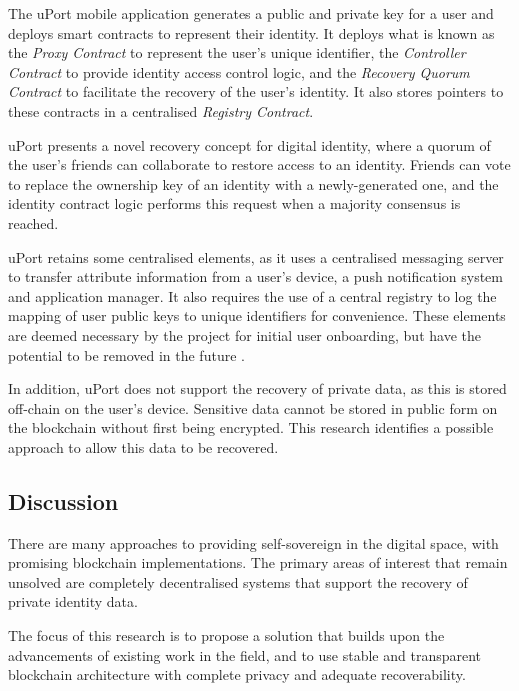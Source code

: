 The uPort mobile application generates a public and private key for a user and deploys smart contracts to represent their identity. It deploys what is known as the \textit{Proxy Contract} to represent the user's unique identifier, the \textit{Controller Contract} to provide identity access control logic, and the \textit{Recovery Quorum Contract} to facilitate the recovery of the user's identity. It also stores pointers to these contracts in a centralised \textit{Registry Contract}.

uPort presents a novel recovery concept for digital identity, where a quorum of the user's friends can collaborate to restore access to an identity. Friends can vote to replace the ownership key of an identity with a newly-generated one, and the identity contract logic performs this request when a majority consensus is reached.

uPort retains some centralised elements, as it uses a centralised messaging server to transfer attribute information from a user's device, a push notification system and application manager. It also requires the use of a central registry to log the mapping of user public keys to unique identifiers for convenience. These elements are deemed necessary by the project for initial user onboarding, but have the potential to be removed in the future \cite{braendgaard_response:_2017}.

In addition, uPort does not support the recovery of private data, as this is stored off-chain on the user's device. Sensitive data cannot be stored in public form on the blockchain without first being encrypted. This research identifies a possible approach to allow this data to be recovered.

\subsection{Discussion}
There are many approaches to providing self-sovereign in the digital space, with promising blockchain implementations. The primary areas of interest that remain unsolved are completely decentralised systems that support the recovery of private identity data. 

The focus of this research is to propose a solution that builds upon the advancements of existing work in the field, and to use stable and transparent blockchain architecture with complete privacy and adequate recoverability.